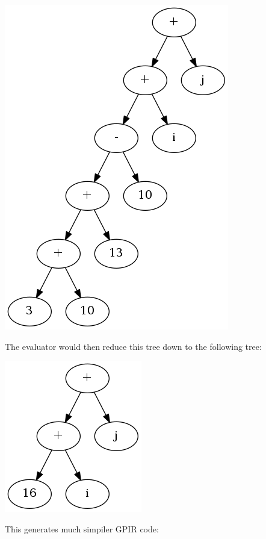 \begin{center}
\includegraphics[scale=0.4]{graphs/optimalEvalTree.png}
\end{center}

The evaluator would then reduce this tree down to the following tree:

\begin{center}
\includegraphics[scale=0.4]{graphs/optimalFullyEvalTree.png}
\end{center}

This generates much simpiler GPIR code:
 


